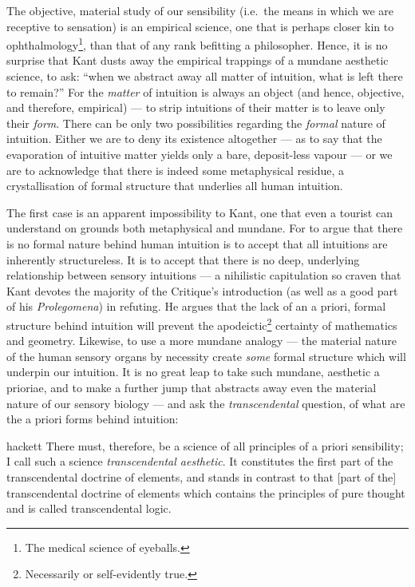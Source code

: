 \noindent
The objective, material study of our sensibility (i.e.\ the means in which we are receptive to sensation) is an empirical science, one that is perhaps closer kin to ophthalmology\footnote{The medical science of eyeballs.}, than that of any rank befitting a philosopher. Hence, it is no surprise that Kant dusts away the empirical trappings of a mundane aesthetic science, to ask: \enquote{when we abstract away all matter of intuition, what is left there to remain?} For the \emph{matter} of intuition is always an object (and hence, objective, and therefore, empirical) --- to strip intuitions of their matter is to leave only their \emph{form}. There can be only two possibilities regarding the \emph{formal} nature of intuition. Either we are to deny its existence altogether --- as to say that the evaporation of intuitive matter yields only a bare, deposit-less vapour --- or we are to acknowledge that there is indeed some metaphysical residue, a crystallisation of formal structure that underlies all human intuition.

The first case is an apparent impossibility to Kant, one that even a tourist can understand on grounds both metaphysical and mundane. For to argue that there is no formal nature behind human intuition is to accept that all intuitions are inherently structureless. It is to accept that there is no deep, underlying relationship between sensory intuitions --- a nihilistic capitulation so craven that Kant devotes the majority of the Critique's introduction (as well as a good part of his \emph{Prolegomena}) in refuting. He argues that the lack of an a priori, formal structure behind intuition will prevent the apodeictic\footnote{Necessarily or self-evidently true.} certainty of mathematics and geometry. Likewise, to use a more mundane analogy --- the material nature of the human sensory organs by necessity create \emph{some} formal structure which will underpin our intuition. It is no great leap to take such mundane, aesthetic a prioriae, and to make a further jump that abstracts away even the material nature of our sensory biology --- and ask the \emph{transcendental} question, of what are the a priori forms behind intuition:

\begin{displaycquote}[B36]{hackett}
  There must, therefore, be a science of all principles of a priori sensibility; I call such a science \emph{transcendental aesthetic}. It constitutes the first part of the transcendental doctrine of elements, and stands in contrast to that [part of the] transcendental doctrine of elements which contains the principles of pure thought and is called transcendental logic.
\end{displaycquote}

